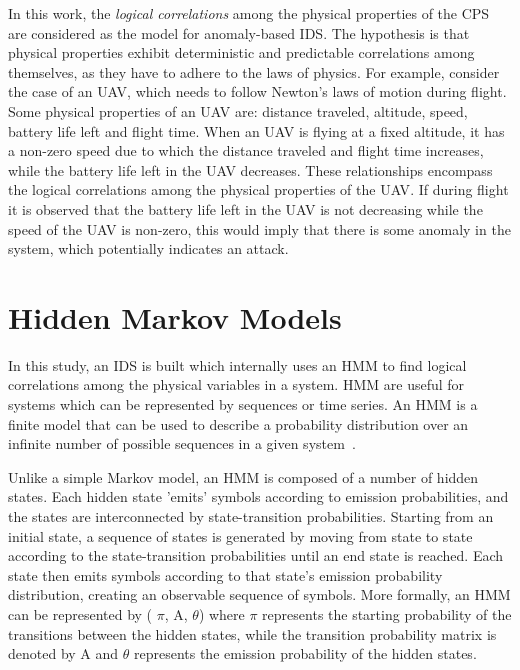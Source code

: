 In this work, the {\em logical correlations} among the physical properties of the \ac{CPS} are considered as the model for anomaly-based \ac{IDS}. The hypothesis is that physical properties exhibit deterministic and predictable correlations among themselves, as they have to adhere to the laws of physics. For example, consider the case of an \ac{UAV}, which needs to follow Newton's laws of motion during flight. Some physical properties of an \ac{UAV} are: distance traveled, altitude, speed, battery life left and flight time. When an \ac{UAV} is flying at a fixed altitude, it has a non-zero speed due to which the distance traveled and flight time increases, while the battery life left in the \ac{UAV} decreases. These relationships encompass the logical correlations among the physical properties of the \ac{UAV}. If during flight it is observed that the battery life left in the \ac{UAV} is not decreasing while the speed of the \ac{UAV} is non-zero, this would imply that there is some anomaly in the system, which potentially indicates an attack.

\section{Hidden Markov Models}
\label{sec:HMM_explain}

In this study, an \ac{IDS} is built which internally uses an \ac{HMM} to find logical correlations among the physical variables in a system. \ac{HMM} are useful for systems which can be represented by sequences or time series. An \ac{HMM} is a finite model that can be used to describe a probability distribution over an infinite number of possible sequences in a given system~\cite{eddy1996hidden}.

Unlike a simple Markov model, an \ac{HMM} is composed of a number of hidden states. Each hidden state 'emits' symbols according to emission probabilities, and the states are interconnected by state-transition probabilities. Starting from an initial state, a sequence of states is generated by moving from state to state according to the state-transition probabilities until an end state is reached. Each state then emits symbols according to that state's emission probability distribution, creating an observable sequence of symbols.
More formally, an \ac{HMM} can be represented by ( $\pi$, A, $\theta$) where $\pi$ represents the starting probability of the transitions between the hidden states, while the transition probability matrix is denoted by A and $\theta$ represents the emission probability of the hidden states.

